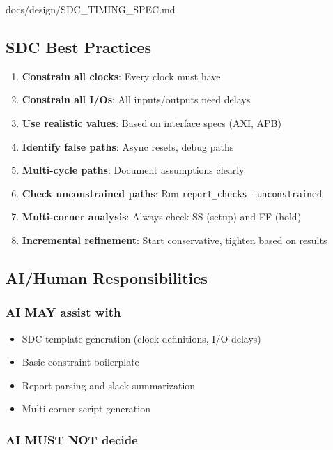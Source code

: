 \begin{relocated}{docs/design/SDC_TIMING_SPEC.md}
\subsection{SDC Best Practices}\label{ds:ch:sdc-timing-spec:sdc-best-practices}

\begin{enumerate}
\def\labelenumi{\arabic{enumi}.}
\tightlist
\item
  \textbf{Constrain all clocks}: Every clock must have
\item
  \textbf{Constrain all I/Os}: All inputs/\allowbreak{}outputs need
  delays
\item
  \textbf{Use realistic values}: Based on interface specs (AXI, APB)
\item
  \textbf{Identify false paths}: Async resets, debug paths
\item
  \textbf{Multi-cycle paths}: Document assumptions clearly
\item
  \textbf{Check unconstrained paths}: Run
  \texttt{report\_\allowbreak{}checks\ -\allowbreak{}unconstrained}
\item
  \textbf{Multi-corner analysis}: Always check SS (setup) and FF (hold)
\item
  \textbf{Incremental refinement}: Start conservative, tighten based on
  results
\end{enumerate}

\subsection{AI/Human Responsibilities}\label{ds:ch:sdc-timing-spec:aihuman-responsibilities}

\subsubsection{AI MAY assist with}\label{ds:ch:sdc-timing-spec:ai-may-assist-with}

\begin{itemize}
\tightlist
\item
  SDC template generation (clock definitions, I/O delays)
\item
  Basic constraint boilerplate
\item
  Report parsing and slack summarization
\item
  Multi-corner script generation
\end{itemize}

\subsubsection{AI MUST NOT decide}\label{ds:ch:sdc-timing-spec:ai-must-not-decide}


\end{relocated}
